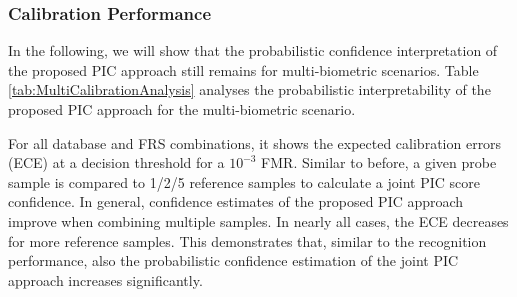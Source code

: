 \documentclass[10pt,twocolumn,letterpaper]{article}
\begin{document}
\vspace{-3mm}
\subsubsection{Calibration Performance}
\vspace{-2mm}


In the following, we will show that the probabilistic confidence interpretation of the proposed PIC approach still remains for multi-biometric scenarios.
Table \ref{tab:MultiCalibrationAnalysis} analyses the probabilistic interpretability of the proposed PIC approach for the multi-biometric scenario.

For all database and FRS combinations, it shows the expected calibration errors (ECE) at a decision threshold for a $10^{-3}$ FMR.
Similar to before, a given probe sample is compared to 1/2/5 reference samples to calculate a joint PIC score confidence.
In general, confidence estimates of the proposed PIC approach improve when combining multiple samples.
In nearly all cases, the ECE decreases for more reference samples.
This demonstrates that, similar to the recognition performance, also the probabilistic confidence estimation of the joint PIC approach increases significantly.
\end{document}
